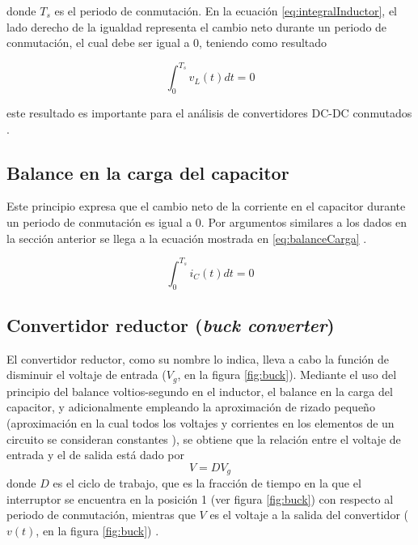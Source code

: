 donde $T_s$ es el periodo de conmutación. En la ecuación \ref{eq:integralInductor}, el lado
derecho de la igualdad representa el cambio neto durante un periodo de conmutación, el cual 
debe ser igual a 0, teniendo como resultado

\begin{equation}
    \int_0^{T_s} v_L(t) d t = 0
\end{equation}

este resultado es importante para el análisis de convertidores DC-DC conmutados \cite{erickson_fundamentals_2020}.

\subsection{Balance en la carga del capacitor}

Este principio expresa que el cambio neto de la corriente en el capacitor durante un periodo 
de conmutación es igual a 0. Por argumentos similares a los dados en la sección anterior se 
llega a la ecuación mostrada en \ref{eq:balanceCarga} \cite{erickson_fundamentals_2020}.

\begin{equation}
    \int_0^{T_s} i_C(t) d t = 0
    \label{eq:balanceCarga}
\end{equation}

\subsection{Convertidor reductor (\textit{buck converter})}

El convertidor reductor, como su nombre lo indica, lleva a cabo la función de disminuir
 el voltaje de entrada ($V_g$, en la figura \ref{fig:buck}). Mediante el uso del principio del
balance voltios-segundo en el inductor, el balance en la carga del capacitor, y
 adicionalmente empleando la aproximación de rizado pequeño (aproximación en la cual todos los 
voltajes y corrientes en los elementos de un circuito se consideran constantes  \cite{erickson_fundamentals_2020}),
 se obtiene que la relación entre el voltaje de entrada y el de salida está dado por 
 \begin{equation}
    V=DV_g  
    \label{eq:salida_buck}
 \end{equation}
donde $D$ es el ciclo de trabajo, que es la fracción de tiempo en la que el
interruptor se encuentra en la posición 1 (ver figura \ref{fig:buck}) con
respecto al periodo de conmutación, mientras que $V$ es el voltaje 
a la salida del convertidor ($v(t)$, en la figura \ref{fig:buck})
 \cite{erickson_fundamentals_2020}. 



